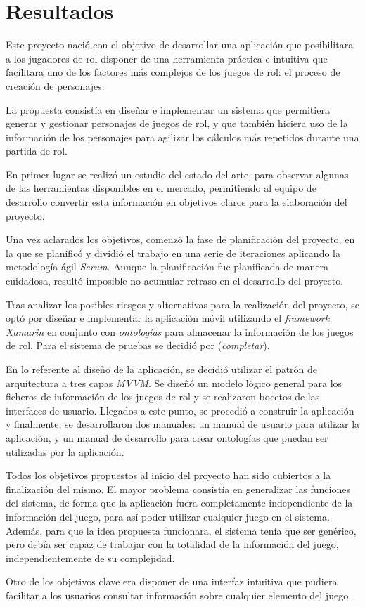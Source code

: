 
\section{Resultados}
Este proyecto nació con el objetivo de desarrollar una aplicación que posibilitara a los jugadores de rol 
disponer de una herramienta práctica e intuitiva que facilitara uno de los factores más complejos de los 
juegos de rol: el proceso de creación de personajes. \medskip 

La propuesta consistía en diseñar e implementar un sistema que permitiera generar y gestionar personajes de juegos de rol, 
y que también hiciera uso de la información de los personajes para agilizar los cálculos más repetidos 
durante una partida de rol. \medskip

En primer lugar se realizó un estudio del estado del arte, para observar algunas de las herramientas disponibles en el mercado, 
permitiendo al equipo de desarrollo convertir esta información en objetivos claros para la elaboración del proyecto.\medskip

Una vez aclarados los objetivos, comenzó la fase de planificación del proyecto, en la que se planificó y dividió el trabajo en 
una serie de iteraciones aplicando la metodología ágil \textit{Scrum}. Aunque la planificación fue planificada de manera cuidadosa, 
resultó imposible no acumular retraso en el desarrollo del proyecto.\medskip

Tras analizar los posibles riesgos y alternativas para la realización del proyecto, se optó por diseñar e implementar la aplicación 
móvil utilizando el \textit{framework Xamarin} en conjunto con \textit{ontologías} para almacenar la información de los juegos de rol.
Para el sistema de pruebas se decidió por (\textit{completar}). 

En lo referente al diseño de la aplicación, se decidió utilizar el patrón de arquitectura a tres capas \textit{MVVM}. 
Se diseñó un modelo lógico general para los ficheros de información de los juegos de rol y se realizaron bocetos de 
las interfaces de usuario. Llegados a este punto, se procedió a construir la aplicación y finalmente, se desarrollaron 
dos manuales: un manual de usuario para utilizar la aplicación, y un manual de desarrollo para crear ontologías que 
puedan ser utilizadas por la aplicación.\medskip 

Todos los objetivos propuestos al inicio del proyecto han sido cubiertos a la finalización del mismo. El mayor problema 
consistía en generalizar las funciones del sistema, de forma que la aplicación fuera completamente independiente de la 
información del juego, para así poder utilizar cualquier juego en el sistema. Además, para que la idea propuesta funcionara, el 
sistema tenía que ser genérico, pero debía ser capaz de trabajar con la totalidad de la información del juego, independientemente 
de su complejidad. \medskip 

Otro de los objetivos clave era disponer de una interfaz intuitiva que pudiera facilitar a los usuarios consultar información sobre 
cualquier elemento del juego.